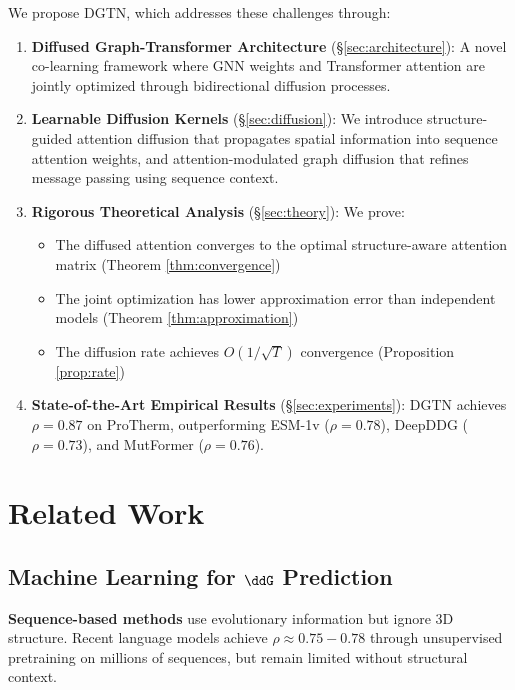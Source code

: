 \documentclass[12pt,en]{elegantpaper}
\begin{document}
We propose DGTN, which addresses these challenges through:

\begin{enumerate}
    \item \textbf{Diffused Graph-Transformer Architecture} (\S\ref{sec:architecture}): A novel co-learning framework where GNN weights and Transformer attention are jointly optimized through bidirectional diffusion processes.
    
    \item \textbf{Learnable Diffusion Kernels} (\S\ref{sec:diffusion}): We introduce structure-guided attention diffusion that propagates spatial information into sequence attention weights, and attention-modulated graph diffusion that refines message passing using sequence context.
    
    \item \textbf{Rigorous Theoretical Analysis} (\S\ref{sec:theory}): We prove:
    \begin{itemize}
        \item The diffused attention converges to the optimal structure-aware attention matrix (Theorem \ref{thm:convergence})
        \item The joint optimization has lower approximation error than independent models (Theorem \ref{thm:approximation})
        \item The diffusion rate achieves $O(1/\sqrt{T})$ convergence (Proposition \ref{prop:rate})
    \end{itemize}
    
    \item \textbf{State-of-the-Art Empirical Results} (\S\ref{sec:experiments}): DGTN achieves $\rho = 0.87$ on ProTherm, outperforming ESM-1v ($\rho = 0.78$), DeepDDG ($\rho = 0.73$), and MutFormer ($\rho = 0.76$).
\end{enumerate}

\section*{Related Work}

\subsection{Machine Learning for $\ddG$ Prediction}

\textbf{Sequence-based methods} \citep{capriotti2005mutant,cheng2006prediction} use evolutionary information but ignore 3D structure. Recent language models \citep{meier2021language,rives2021biological} achieve $\rho \approx 0.75-0.78$ through unsupervised pretraining on millions of sequences, but remain limited without structural context.
\end{document}
